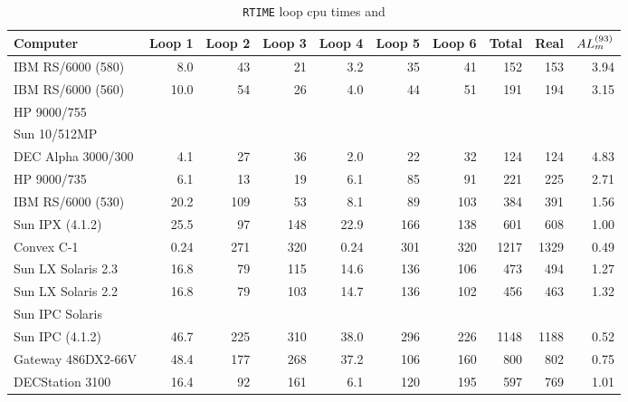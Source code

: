 \begin{table}
\protect\begin{center}
\protect\begin{tabular}{|l|r|r|r|r|r|r|r|r|r|} \hline
Computer & Loop 1 & Loop 2 & Loop 3 & Loop 4 & Loop 5 & Loop 6 &
            Total & Real & $AL_m^{(93)}$ \\ \hline
IBM RS/6000 (580) &  8.0 &  43 &  21 &  3.2 &  35 &  41 &  152 &  153 & 3.94 \\
IBM RS/6000 (560) & 10.0 &  54 &  26 &  4.0 &  44 &  51 &  191 &  194 & 3.15 \\
HP 9000/755       &      &     &     &      &     &     &      &      &      \\
Sun 10/512MP      &      &     &     &      &     &     &      &      &      \\
DEC Alpha 3000/300&  4.1 &  27 &  36 &  2.0 &  22 &  32 &  124 &  124 & 4.83 \\
HP 9000/735       &  6.1 &  13 &  19 &  6.1 &  85 &  91 &  221 &  225 & 2.71 \\
IBM RS/6000 (530) & 20.2 & 109 &  53 &  8.1 &  89 & 103 &  384 &  391 & 1.56 \\
Sun IPX (4.1.2)   & 25.5 &  97 & 148 & 22.9 & 166 & 138 &  601 &  608 & 1.00 \\
Convex C-1        & 0.24 & 271 & 320 & 0.24 & 301 & 320 & 1217 & 1329 & 0.49 \\
Sun LX Solaris 2.3& 16.8 &  79 & 115 & 14.6 & 136 & 106 &  473 &  494 & 1.27 \\
Sun LX Solaris 2.2& 16.8 &  79 & 103 & 14.7 & 136 & 102 &  456 &  463 & 1.32 \\
Sun IPC Solaris   &      &     &     &      &     &     &      &      &      \\
Sun IPC (4.1.2)   & 46.7 & 225 & 310 & 38.0 & 296 & 226 & 1148 & 1188 & 0.52 \\
Gateway 486DX2-66V& 48.4 & 177 & 268 & 37.2 & 106 & 160 &  800 &  802 & 0.75 \\
DECStation 3100   & 16.4 &  92 & 161 &  6.1 & 120 & 195 &  597 &  769 & 1.01 \\
\hline
\end{tabular}
\end{center}
\caption{{\tt RTIME} loop cpu times and \LMarks}
\label{ta:RTIME}
\end{table}

